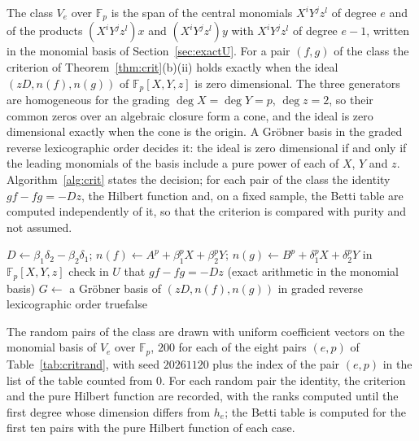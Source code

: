 \documentclass[11pt]{article}
\theoremstyle{definition}
\theoremstyle{remark}
\newcommand{\F}{\mathbb{F}}
\begin{document}
The class $V_e$ over $\F_p$ is the span of the central monomials $X^iY^jz^l$ of degree $e$ and of the products $(X^iY^jz^l)x$ and $(X^iY^jz^l)y$ with $X^iY^jz^l$ of degree $e-1$, written in the monomial basis of Section~\ref{sec:exactU}. For a pair $(f,g)$ of the class the criterion of Theorem~\ref{thm:crit}(b)(ii) holds exactly when the ideal $(zD,n(f),n(g))$ of $\F_p[X,Y,z]$ is zero dimensional. The three generators are homogeneous for the grading $\deg X=\deg Y=p$, $\deg z=2$, so their common zeros over an algebraic closure form a cone, and the ideal is zero dimensional exactly when the cone is the origin. A Gr\"obner basis in the graded reverse lexicographic order decides it: the ideal is zero dimensional if and only if the leading monomials of the basis include a pure power of each of $X$, $Y$ and $z$. Algorithm~\ref{alg:crit} states the decision; for each pair of the class the identity $gf-fg=-Dz$, the Hilbert function and, on a fixed sample, the Betti table are computed independently of it, so that the criterion is compared with purity and not assumed.

\begin{algorithm}[htbp]
\caption{The criterion of Theorem~\ref{thm:crit} for a pair of $V_e$ over $\F_p$. Input: $p$, $e$ and the data $(A,\beta_1,\beta_2;B,\delta_1,\delta_2)$ of $f$ and $g$ as polynomials in $X,Y,z$. Output: true if $M=U/(Uf+Ug)$ has finite length (equivalently, the pair is pure), false otherwise.}
\label{alg:crit}
\begin{algorithmic}[1]
\State $D\gets\beta_1\delta_2-\beta_2\delta_1$; $n(f)\gets A^p+\beta_1^pX+\beta_2^pY$; $n(g)\gets B^p+\delta_1^pX+\delta_2^pY$ in $\F_p[X,Y,z]$
\State check in $U$ that $gf-fg=-Dz$ (exact arithmetic in the monomial basis)
\State $G\gets$ a Gr\"obner basis of $(zD,n(f),n(g))$ in graded reverse lexicographic order
\State \Return true\Else\State \Return false\EndIf
\end{algorithmic}
\end{algorithm}

The random pairs of the class are drawn with uniform coefficient vectors on the monomial basis of $V_e$ over $\F_p$, $200$ for each of the eight pairs $(e,p)$ of Table~\ref{tab:critrand}, with seed $20261120$ plus the index of the pair $(e,p)$ in the list of the table counted from $0$. For each random pair the identity, the criterion and the pure Hilbert function are recorded, with the ranks computed until the first degree whose dimension differs from $h_e$; the Betti table is computed for the first ten pairs with the pure Hilbert function of each case.
\end{document}
